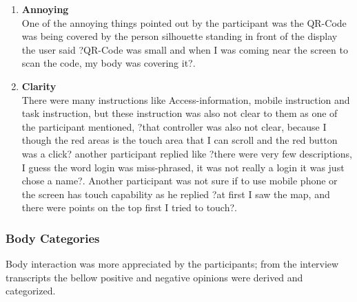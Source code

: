 \begin{enumerate}
\item	\textbf{Annoying}\\
One of the annoying things pointed out by the participant was the QR-Code was being covered by the person silhouette standing in front of the display the user said ?QR-Code was small and when I was coming near the screen to scan the code, my body was covering it?.

\item	\textbf{Clarity}\\
There were many instructions like Access-information, mobile instruction and task instruction, but these instruction was also not clear to them as one of the participant mentioned, ?that controller was also not clear, because I though the red areas is the touch area that I can scroll and the red button was a click? another participant replied like ?there were very few descriptions, I guess the word login was miss-phrased, it was not really a login it was just chose a name?. Another participant was not sure if to use mobile phone or the screen has touch capability as he replied ?at first I saw the map, and there were points on the top first I tried to touch?.


\end{enumerate}


\subsubsection{Body Categories}
Body interaction was more appreciated by the participants; from the interview transcripts the bellow positive and negative opinions were derived and categorized.

